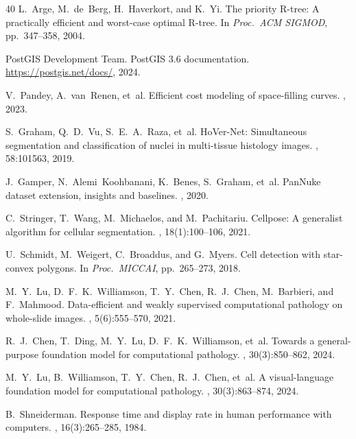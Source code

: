 \documentclass[sigconf]{acmart}
\begin{document}
\begin{thebibliography}{40}
L.~Arge, M.~de~Berg, H.~Haverkort, and K.~Yi.
\newblock The priority R-tree: A practically efficient and worst-case optimal R-tree.
\newblock In {\em Proc.\ ACM SIGMOD}, pp.~347--358, 2004.

PostGIS Development Team.
\newblock PostGIS 3.6 documentation.
\newblock \url{https://postgis.net/docs/}, 2024.

V.~Pandey, A.~van~Renen, et~al.
\newblock Efficient cost modeling of space-filling curves.
, 2023.

S.~Graham, Q.~D.~Vu, S.~E.~A.~Raza, et~al.
\newblock HoVer-Net: Simultaneous segmentation and classification of nuclei in multi-tissue histology images.
, 58:101563, 2019.

J.~Gamper, N.~Alemi~Koohbanani, K.~Benes, S.~Graham, et~al.
\newblock PanNuke dataset extension, insights and baselines.
, 2020.

C.~Stringer, T.~Wang, M.~Michaelos, and M.~Pachitariu.
\newblock Cellpose: A generalist algorithm for cellular segmentation.
, 18(1):100--106, 2021.

U.~Schmidt, M.~Weigert, C.~Broaddus, and G.~Myers.
\newblock Cell detection with star-convex polygons.
\newblock In {\em Proc.\ MICCAI}, pp.~265--273, 2018.

M.~Y.~Lu, D.~F.~K.~Williamson, T.~Y.~Chen, R.~J.~Chen, M.~Barbieri, and F.~Mahmood.
\newblock Data-efficient and weakly supervised computational pathology on whole-slide images.
, 5(6):555--570, 2021.

R.~J.~Chen, T.~Ding, M.~Y.~Lu, D.~F.~K.~Williamson, et~al.
\newblock Towards a general-purpose foundation model for computational pathology.
, 30(3):850--862, 2024.

M.~Y.~Lu, B.~Williamson, T.~Y.~Chen, R.~J.~Chen, et~al.
\newblock A visual-language foundation model for computational pathology.
, 30(3):863--874, 2024.

B.~Shneiderman.
\newblock Response time and display rate in human performance with computers.
, 16(3):265--285, 1984.


\end{thebibliography}
\end{document}
